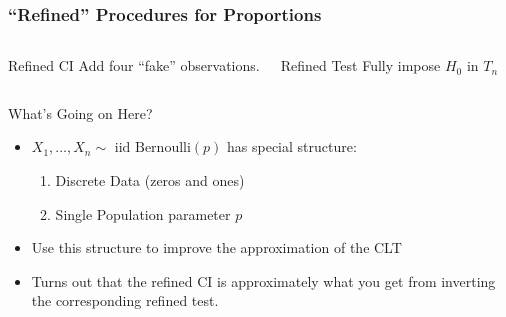 \documentclass[handout]{beamer}
\begin{document}



\begin{frame}
	\frametitle{``Refined'' Procedures for Proportions}
\begin{columns}
	\begin{block}
		{Refined CI}
		Add four ``fake'' observations.
	\end{block}
		\begin{block}
			{Refined Test} Fully impose $H_0$ in $T_n$
		\end{block}
\end{columns}

\vspace{2em}

\begin{block}
	{What's Going on Here?}
		\begin{itemize}
		\item $X_1, \hdots, X_n \sim \mbox{ iid Bernoulli}(p)$ has special structure:
			\begin{enumerate}
				\item Discrete Data (zeros and ones)
				\item Single Population parameter $p$ 
			\end{enumerate}
		\item Use this structure to improve the approximation of the CLT
		\item Turns out that the refined CI is approximately what you get from inverting the corresponding refined test.
	\end{itemize}
\end{block}
\end{frame}
\end{document}

